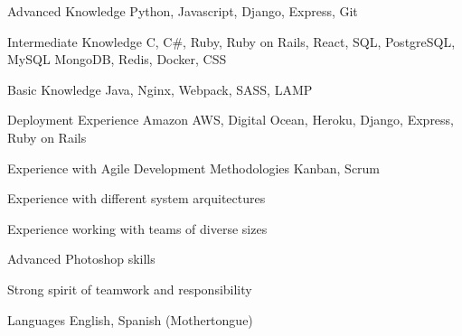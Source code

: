 

\begin{cvskills}

  \cvskill
    {Advanced Knowledge}
    {Python, Javascript, Django, Express, Git}

  \cvskill
    {Intermediate Knowledge}
    {C, C\#, Ruby, Ruby on Rails, React, SQL, PostgreSQL, MySQL}
  \cvskill
    {}
    {MongoDB, Redis, Docker, CSS}

  \cvskill
    {Basic Knowledge}
    {Java, Nginx, Webpack, SASS, LAMP}

  \cvskill
    {Deployment Experience}
    {Amazon AWS, Digital Ocean, Heroku, Django, Express, Ruby on Rails}

  \cvskill
    {Experience with Agile Development Methodologies}
    {Kanban, Scrum}

  \cvskill
    {Experience with different system arquitectures}
    {}

  \cvskill
    {Experience working with teams of diverse sizes}
    {}

  \cvskill
    {Advanced Photoshop skills}
    {}

  \cvskill
    {Strong spirit of teamwork and responsibility}
    {}

  \cvskill
    {Languages}
    {English, Spanish (Mothertongue)}

\end{cvskills}
